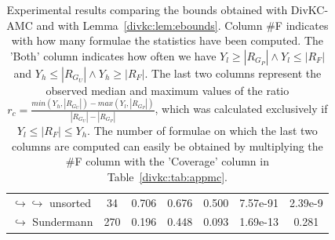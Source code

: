 \documentclass{article}
\newcommand\divkcamc[0]{DivKC-AMC\xspace}
\begin{document}
\begin{table}[h!]
\begin{tabular}{l|c|c|c|c|c|c}
$\hookrightarrow \hookrightarrow$ unsorted & 34 & 0.706 & 0.676 & 0.500 & 7.57e-91 & 2.39e-9 \\
$\hookrightarrow$ Sundermann \cite{SBK+:SPLC24} & 270 & 0.196 & 0.448 & 0.093 & 1.69e-13 & 0.281 \\
            \end{tabular}
                \caption{Experimental results comparing the bounds obtained with \divkcamc and with Lemma~\ref{divkc:lem:ebounds}.
        Column \#F indicates with how many formulae the statistics have been computed.
        The 'Both' column indicates how often we have $Y_l \geq |R_{G_P}| \land Y_l \leq |R_F|$
        and $Y_h \leq |R_{G_U}| \land Y_h \geq |R_F|$.
        The last two columns represent the observed median and maximum values of the ratio $r_c = \frac{\textit{min}(Y_h, |R_{G_U}|) - \textit{max}(Y_l, |R_{G_P}|)}{|R_{G_U}| - |R_{G_P}|}$, which was calculated exclusively if $Y_l \leq |R_F| \leq Y_h$.
        The number of formulae on which the last two columns are computed can easily be obtained by multiplying the \#F column with the 'Coverage' column in Table~\ref{divkc:tab:appmc}.
        }
        \label{divkc:tab:coverage}
    \end{table}
\end{document}
